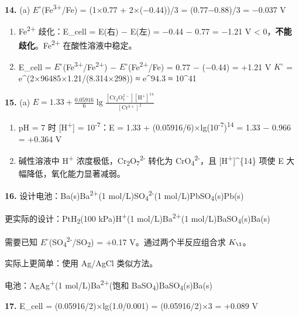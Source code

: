\documentclass[a4paper,11pt]{ctexart}
\begin{document}
\textbf{14.}
(a) \(E^{\circ}\)(Fe\textsuperscript{3+}/Fe) = (1×0.77 + 2×(−0.44))/3 = (0.77−0.88)/3 = −0.037 V

\begin{enumerate}
\def\labelenumi{(\alph{enumi})}
\setcounter{enumi}{1}
\item
  Fe\textsuperscript{2+} 歧化：E\_cell = E(右) − E(左) = −0.44 − 0.77 = −1.21 V \textless{} 0，\textbf{不能歧化}。Fe\textsuperscript{2+} 在酸性溶液中稳定。
\item
  E\_cell = \(E^{\circ}\)(Fe\textsuperscript{3+}/Fe\textsuperscript{2+}) − \(E^{\circ}\)(Fe\textsuperscript{2+}/Fe) = 0.77 − (−0.44) = +1.21 V
  \(K^{\circ}\) = e\^{}(2×96485×1.21/(8.314×298)) ≈ e\^{}94.3 ≈ 10\^{}41
\end{enumerate}

\textbf{15.}
(a) \(E = 1.33 + \frac{0.05916}{6}\lg\frac{[\mathrm{Cr_2O_7^{2-}}][\mathrm{H^+}]^{14}}{[\mathrm{Cr^{3+}}]^2}\)

\begin{enumerate}
\def\labelenumi{(\alph{enumi})}
\setcounter{enumi}{1}
\item
  pH = 7 时 {[}H\textsuperscript{+}{]} = 10\textsuperscript{-7}：E = 1.33 + (0.05916/6)×lg(10\textsuperscript{-7})\textsuperscript{14} = 1.33 − 0.966 = +0.364 V
\item
  碱性溶液中 H\textsuperscript{+} 浓度极低，Cr\textsubscript{2}O\textsubscript{7}\textsuperscript{2-} 转化为 CrO\textsubscript{4}\textsuperscript{2-}，且 {[}H\textsuperscript{+}{]}\^{}\{14\} 项使 E 大幅降低，氧化能力显著减弱。
\end{enumerate}

\textbf{16.} 设计电池：Ba(s)\textbar Ba\textsuperscript{2+}(1 mol/L)\textbar\textbar SO\textsubscript{4}\textsuperscript{2-}(1 mol/L)\textbar PbSO\textsubscript{4}(s)\textbar Pb(s)

更实际的设计：Pt\textbar H\textsubscript{2}(100 kPa)\textbar H\textsuperscript{+}(1 mol/L)\textbar\textbar Ba\textsuperscript{2+}(1 mol/L)\textbar BaSO\textsubscript{4}(s)\textbar Ba(s)

需要已知 \(E^{\circ}\)(SO\textsubscript{4}\textsuperscript{2-}/SO\textsubscript{2}) = +0.17 V。通过两个半反应组合求 \(K_{\1}\)。

实际上更简单：使用 Ag/AgCl 类似方法。

电池：Ag\textbar Ag\textsuperscript{+}(1 mol/L)\textbar\textbar Ba\textsuperscript{2+}(饱和 BaSO\textsubscript{4})\textbar BaSO\textsubscript{4}(s)\textbar Ba(s)

\textbf{17.} E\_cell = (0.05916/2)×lg(1.0/0.001) = (0.05916/2)×3 = +0.089 V
\end{document}
